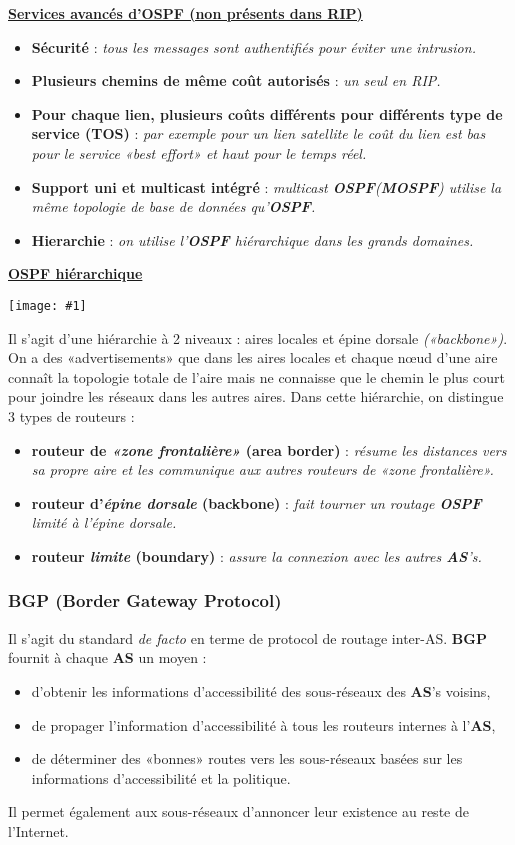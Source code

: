 \documentclass{article}
\newcommand{\imgR}[2]{\begin{center}\texttt{[image: \#1]}\end{center}}
\newcommand{\bfp}[2]{\item \textbf{#1} : \textit{#2}}
\begin{document}
\noindent\textbf{\underline{Services avancés d'OSPF (non présents dans RIP)}}\\
\begin{itemize}
\bfp{Sécurité}{tous les messages sont authentifiés pour éviter une intrusion.}
\bfp{Plusieurs chemins de même coût autorisés}{un seul en RIP.}
\bfp{Pour chaque lien, plusieurs coûts différents pour différents type de service (\textbf{TOS)}}{par exemple 
pour un lien satellite le coût du lien est bas pour le service «best effort» et haut pour le temps réel.}
\bfp{Support uni et multicast intégré}{multicast \textbf{OSPF}(\textbf{MOSPF}) utilise la même topologie de base
de données qu'\textbf{OSPF}.}
\bfp{Hierarchie}{on utilise l'\textbf{OSPF} hiérarchique dans les grands domaines.}\\
\end{itemize}
\newpage
\noindent\textbf{\underline{OSPF hiérarchique}} \\

\imgR{CN_094.png}{250}

Il s'agit d'une hiérarchie à 2 niveaux : aires locales et épine dorsale \textit{(«backbone»)}. On a des 
«advertisements» que dans les aires locales et chaque n\oe ud d'une aire connaît la topologie totale de l'aire 
mais ne connaisse que le chemin le plus court pour joindre les réseaux dans les autres aires. Dans cette 
hiérarchie, on distingue 3 types de routeurs : 
\begin{itemize}
\bfp{routeur de \textit{«zone frontalière»} (area border)}{résume les distances vers sa propre aire et les 
communique aux autres routeurs de \textit{«zone frontalière»}.}
\bfp{routeur d'\textit{épine dorsale} (backbone)}{fait tourner un routage \textbf{OSPF} limité à l'épine 
dorsale.}
\bfp{routeur \textit{limite} (boundary)}{assure la connexion avec les autres \textbf{AS}'s.}
\end{itemize}

\subsubsection{BGP (Border Gateway Protocol)}

\noindent Il s'agit du standard \textit{de facto} en terme de protocol de routage inter-AS. \textbf{BGP} fournit 
à chaque \textbf{AS} un moyen :
\begin{itemize}
\item d'obtenir les informations d'accessibilité des sous-réseaux des \textbf{AS}'s voisins,
\item de propager l'information d'accessibilité à tous les routeurs internes à l'\textbf{AS},
\item de déterminer des «bonnes» routes vers les sous-réseaux basées sur les informations d'accessibilité et la 
politique.
\end{itemize}
Il permet également aux sous-réseaux d'annoncer leur existence au reste de l'Internet. \\
\end{document}
